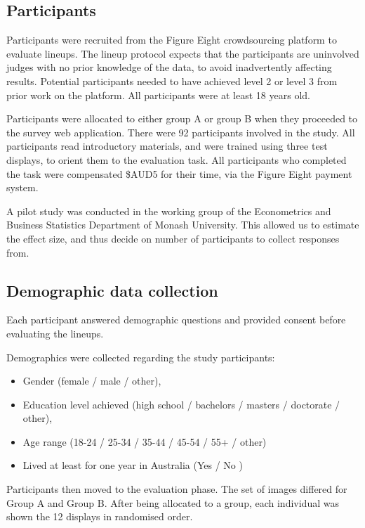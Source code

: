 \documentclass{monashthesis}
\begin{document}
\hypertarget{participants}{%
\subsection{Participants}\label{participants}}

Participants were recruited from the Figure Eight crowdsourcing platform \autocite{figeight} to evaluate lineups.
The lineup protocol expects that the participants are uninvolved judges with no prior knowledge of the data, to avoid inadvertently affecting results. Potential participants needed to have achieved level 2 or level 3 from prior work on the platform. All participants were at least 18 years old.

Participants were allocated to either group A or group B when they proceeded to the survey web application. There were 92 participants involved in the study. All participants read introductory materials, and were trained using three test displays, to orient them to the evaluation task. All participants who completed the task were compensated \$AUD5 for their time, via the Figure Eight payment system.

A pilot study was conducted in the working group of the Econometrics and Business Statistics Department of Monash University. This allowed us to estimate the effect size, and thus decide on number of participants to collect responses from.

\hypertarget{demographic-data-collection}{%
\subsection{Demographic data collection}\label{demographic-data-collection}}

Each participant answered demographic questions and provided consent before evaluating the lineups.

Demographics were collected regarding the study participants:

\begin{itemize}
\tightlist
\item
  Gender (female / male / other),
\item
  Education level achieved (high school / bachelors / masters / doctorate / other),
\item
  Age range (18-24 / 25-34 / 35-44 / 45-54 / 55+ / other)
\item
  Lived at least for one year in Australia (Yes / No )
\end{itemize}

Participants then moved to the evaluation phase.
The set of images differed for Group A and Group B.
After being allocated to a group, each individual was shown the 12 displays in randomised order.
\end{document}
